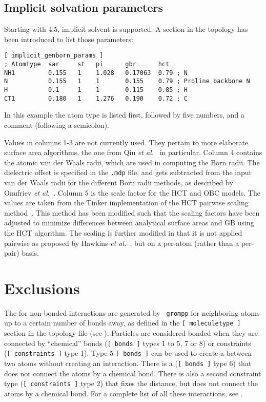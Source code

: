 \subsection{Implicit solvation parameters}
Starting with {\gromacs} 4.5, implicit solvent is supported. A section in the
topology has been introduced to list those parameters:

{\small
\begin{verbatim}
[ implicit_genborn_params ]
; Atomtype  sar     st   pi      gbr      hct
NH1         0.155   1    1.028   0.17063  0.79 ; N
N           0.155   1    1       0.155    0.79 ; Proline backbone N
H           0.1     1    1       0.115    0.85 ; H
CT1         0.180   1    1.276   0.190    0.72 ; C
\end{verbatim}}

In this example the atom type is listed first, followed by five
numbers, and a comment (following a semicolon).

Values in columns 1-3 are not currently used. They pertain to more
elaborate surface area algorithms, the one from Qiu {\em et al.}~\cite{Still97} in
particular.  Column 4 contains the atomic van der Waals radii, which are used
in computing the Born radii. The dielectric offset is specified in
the {\tt *.mdp} file, and gets subtracted from the input van der Waals radii for the different
Born radii methods, as described by Onufriev {\em et al.}~\cite{Case04}.  Column 5 is the 
scale factor for the HCT and OBC models. The values are taken from the Tinker implementation of 
the HCT pairwise scaling method~\cite{Truhlar96}.  This method has been modified such that the
scaling factors have been adjusted to minimize differences between analytical surface areas and
GB using the HCT algorithm.  The scaling is further modified in that it is not applied pairwise
as proposed by Hawkins {\em et al.}~\cite{Truhlar96}, but on a per-atom (rather than a per-pair) 
basis.



\section{Exclusions}
\label{sec:excl}
The  for non-bonded interactions are generated by {\tt
grompp} for neighboring atoms up to a certain number of bonds away, as
defined in the {\tt [~moleculetype~]} section in the topology file
(see ). Particles are considered bonded when they are
connected by ``chemical'' bonds ({\tt [~bonds~]} types 1 to 5, 7 or 8)
or constraints ({\tt [~constraints~]} type 1).
Type 5 {\tt [~bonds~]} can be used to create a 
between two atoms without creating an interaction.
There is a 
({\tt [~bonds~]} type 6) that does not connect the atoms by a chemical bond.
There is also a second constraint type ({\tt [~constraints~]} type 2)
that fixes the distance, but does not connect
the atoms by a chemical bond.
For a complete list of all these interactions, see .

